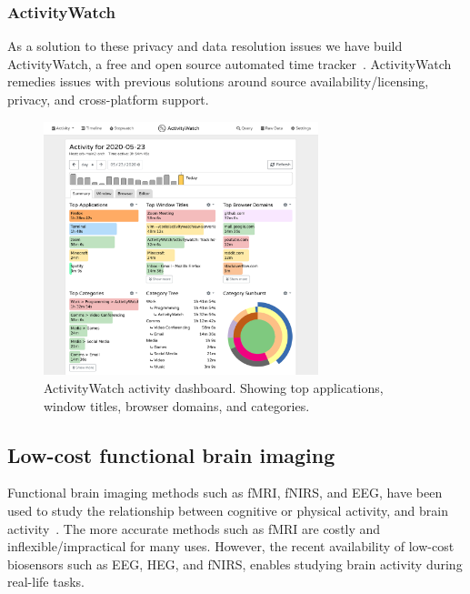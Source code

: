 \documentclass{IEEEtran}
\begin{document}
\subsubsection{ActivityWatch}

As a solution to these privacy and data resolution issues we have build ActivityWatch, a free and open source automated time tracker~\cite{bjareholt_activitywatch_nodate}. ActivityWatch remedies issues with previous solutions around source availability/licensing, privacy, and cross-platform support.

\begin{figure}[h]
\centering
\includegraphics[width=8cm]{img/screenshot-aw-activity.png}
\caption{ActivityWatch activity dashboard. Showing top applications, window titles, browser domains, and categories.}\label{fig:aw}
\end{figure}


\subsection{Low-cost functional brain imaging}

Functional brain imaging methods such as fMRI, fNIRS, and EEG, have been used to study the relationship between cognitive or physical activity, and brain activity~\cite{floyd_decoding_2017}\cite{hong_classification_2015}\cite{fucci_replication_2019}. The more accurate methods such as fMRI are costly and inflexible/impractical for many uses. However, the recent availability of low-cost biosensors such as EEG, HEG, and fNIRS, enables studying brain activity during real-life tasks.

\end{document}
